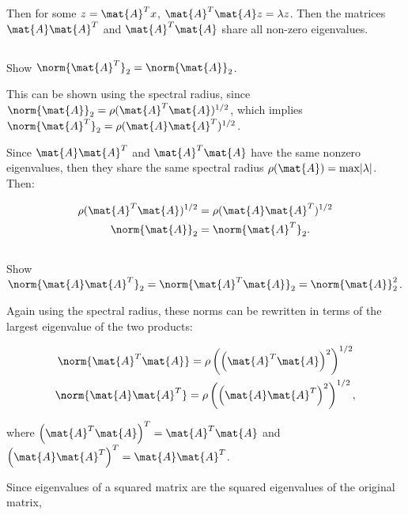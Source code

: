 \documentclass{template}
\begin{document}
Then for some $z=\mat{A}^Tx$, $\mat{A}^T \mat{A}z = \lambda z$. Then the matrices $\mat{A}\mat{A}^T$ and $\mat{A}^T \mat{A}$ share all non-zero eigenvalues.


\subsection{}
Show $\norm{\mat{A}^T}_2 = \norm{\mat{A}}_2$. 

This can be shown using the spectral radius, since $\norm{\mat{A}}_2 = \rho(\mat{A}^T \mat{A})^{1/2}$, which implies $\norm{\mat{A}^T}_2 = \rho(\mat{A} \mat{A}^T)^{1/2}$.

Since $\mat{A} \mat{A}^T$ and $\mat{A}^T \mat{A}$ have the same nonzero eigenvalues, then they share the same spectral radius $\rho(\mat{A}) = \text{max}|\lambda|$. Then:

\begin{equation}\label{eq:spectral-radii}
    \begin{aligned}
        \rho(\mat{A}^T \mat{A})^{1/2} &= \rho(\mat{A} \mat{A}^T)^{1/2}\\
        \norm{\mat{A}}_2 & = \norm{\mat{A}^T}_2.
    \end{aligned}
\end{equation}




\subsection{}

Show $\norm{\mat{A}\mat{A}^T}_2 
= \norm{\mat{A}^T\mat{A}}_2 
= \norm{\mat{A}}_2^2$.


Again using the spectral radius, these norms can be rewritten in terms of the largest eigenvalue of the two products:

\begin{equation}
    \begin{gathered}
        \norm{\mat{A}^T\mat{A}} = \rho\left( \left(\mat{A}^T\mat{A}\right)^2\right)^{1/2}\\
        \norm{\mat{A}\mat{A}^T} = \rho\left( \left(\mat{A}\mat{A}^T\right)^2\right)^{1/2},
    \end{gathered}
\end{equation}

where $\left( \mat{A}^T\mat{A}\right)^T =\mat{A}^T\mat{A} $ and $\left(\mat{A}\mat{A}^T\right)^T =\mat{A}\mat{A}^T$.

Since eigenvalues of a squared matrix are the squared eigenvalues of the original matrix,
\end{document}

